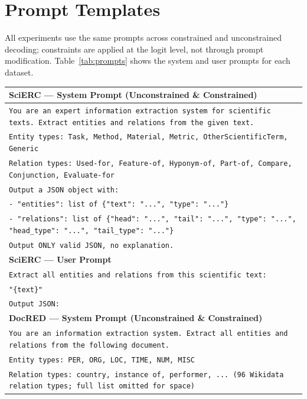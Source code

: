 
\section{Prompt Templates}
\label{app:prompts}

All experiments use the same prompts across constrained and unconstrained decoding; constraints are applied at the logit level, not through prompt modification.
Table~\ref{tab:prompts} shows the system and user prompts for each dataset.

\begin{table}[t]
\centering
\small
\begin{tabular}{@{}p{}@{}}
\toprule
\textbf{SciERC --- System Prompt (Unconstrained \& Constrained)} \\
\midrule
\texttt{You are an expert information extraction system for scientific texts. Extract entities and relations from the given text.} \\[4pt]
\texttt{Entity types: Task, Method, Material, Metric, OtherScientificTerm, Generic} \\
\texttt{Relation types: Used-for, Feature-of, Hyponym-of, Part-of, Compare, Conjunction, Evaluate-for} \\[4pt]
\texttt{Output a JSON object with:} \\
\texttt{- "entities": list of \{"text": "...", "type": "..."\}} \\
\texttt{- "relations": list of \{"head": "...", "tail": "...", "type": "...", "head\_type": "...", "tail\_type": "..."\}} \\[4pt]
\texttt{Output ONLY valid JSON, no explanation.} \\
\midrule
\textbf{SciERC --- User Prompt} \\
\midrule
\texttt{Extract all entities and relations from this scientific text:} \\
\texttt{"\{text\}"} \\
\texttt{Output JSON:} \\
\midrule
\midrule
\textbf{DocRED --- System Prompt (Unconstrained \& Constrained)} \\
\midrule
\texttt{You are an information extraction system. Extract all entities and relations from the following document.} \\[4pt]
\texttt{Entity types: PER, ORG, LOC, TIME, NUM, MISC} \\[4pt]
\texttt{Relation types: country, instance of, performer, ...\ (96 Wikidata relation types; full list omitted for space)} \\[4pt]

\end{tabular}
\end{table}
